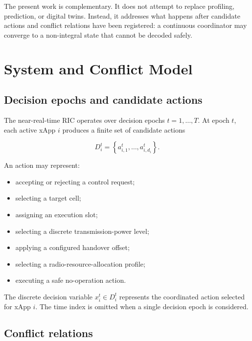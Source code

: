 \documentclass[pdflatex,sn-mathphys-num,iicol,oneside]{sn-jnl}
\begin{document}
The present work is complementary. It does not attempt to replace
profiling, prediction, or digital twins. Instead, it addresses what
happens after candidate actions and conflict relations have been
registered: a continuous coordinator may converge to a non-integral
state that cannot be decoded safely.

\section{System and Conflict Model}
\label{sec:model}

\subsection{Decision epochs and candidate actions}

The near-real-time RIC operates over decision epochs
$t=1,\ldots,T$. At epoch $t$, each active xApp $i$ produces a finite
set of candidate actions

\begin{equation}
D_i^t =
\left\{
a_{i,1}^t,\ldots,a_{i,d_i}^t
\right\}.
\end{equation}

An action may represent:

\begin{itemize}
    \item accepting or rejecting a control request;
    \item selecting a target cell;
    \item assigning an execution slot;
    \item selecting a discrete transmission-power level;
    \item applying a configured handover offset;
    \item selecting a radio-resource-allocation profile;
    \item executing a safe no-operation action.
\end{itemize}

The discrete decision variable $x_i^t\in D_i^t$ represents the
coordinated action selected for xApp $i$. The time index is omitted
when a single decision epoch is considered.

\subsection{Conflict relations}
\end{document}
